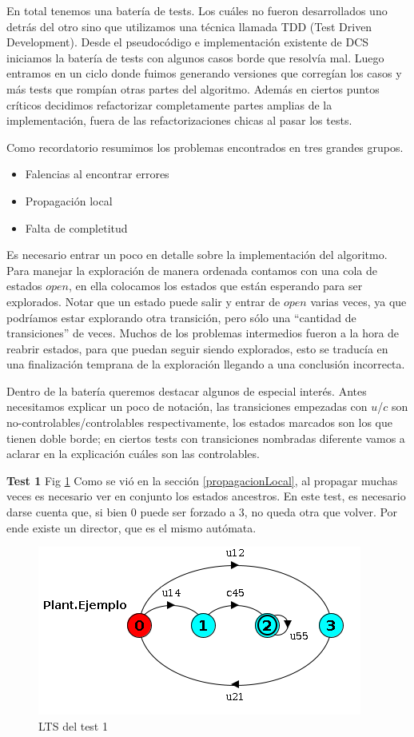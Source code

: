 En total tenemos una batería de \totalTests tests. Los cuáles no fueron desarrollados uno detrás del otro sino que utilizamos una técnica llamada TDD (Test Driven Development). Desde el pseudocódigo e implementación existente de DCS iniciamos la batería de tests con algunos casos borde que resolvía mal.
Luego entramos en un ciclo donde fuimos generando versiones que corregían los casos y más tests que rompían otras partes del algoritmo. Además en ciertos puntos críticos decidimos refactorizar completamente partes amplias de la implementación, fuera de las refactorizaciones chicas al pasar los tests.

Como recordatorio resumimos los problemas encontrados en tres grandes grupos.
\begin{itemize}
 \item Falencias al encontrar errores
 \item Propagación local
 \item Falta de completitud
\end{itemize}

Es necesario entrar un poco en detalle sobre la implementación del algoritmo. Para manejar la exploración de manera ordenada contamos con una cola de estados $open$, en ella colocamos los estados que están esperando para ser explorados. Notar que un estado puede salir y entrar de $open$ varias veces, ya que podríamos estar explorando otra transición, pero sólo una ``cantidad de transiciones'' de veces. Muchos de los problemas intermedios fueron a la hora de reabrir estados, para que puedan seguir siendo explorados, esto se traducía en una finalización temprana de la exploración llegando a una conclusión incorrecta.

Dentro de la batería queremos destacar algunos de especial interés. Antes necesitamos explicar un poco de notación, las transiciones empezadas con $u$/$c$ son no-controlables/controlables respectivamente, los estados marcados son los que tienen doble borde; en ciertos tests con transiciones nombradas diferente vamos a aclarar en la explicación cuáles son las controlables.
\bigskip

\textbf{Test 1} Fig \ref{fig:test1}
Como se vió en la sección \ref{propagacionLocal}, al propagar muchas veces es necesario ver en conjunto los estados ancestros. En este test, es necesario darse cuenta que, si bien $0$ puede ser forzado a $3$, no queda otra que volver. Por ende existe un director, que es el mismo autómata.
\begin{figure}[h]
 \centering
 \includegraphics[scale=0.7]{figures/tests/test1.png}
 \caption{LTS del test 1}
 \label{fig:test1}
\end{figure}

